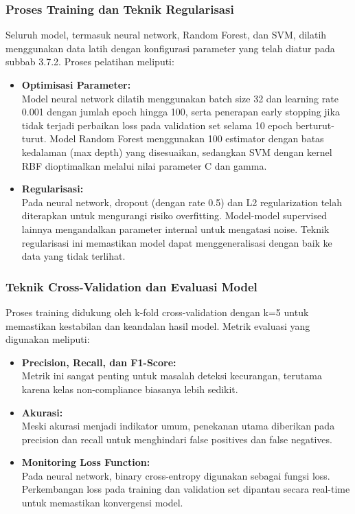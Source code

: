 \subsubsection{Proses Training dan Teknik Regularisasi}
Seluruh model, termasuk neural network, Random Forest, dan SVM, dilatih menggunakan data latih dengan konfigurasi parameter yang telah diatur pada subbab 3.7.2. Proses pelatihan meliputi:
\begin{itemize}
    \item \textbf{Optimisasi Parameter:}\\
    Model neural network dilatih menggunakan batch size 32 dan learning rate 0.001 dengan jumlah epoch hingga 100, serta penerapan early stopping jika tidak terjadi perbaikan loss pada validation set selama 10 epoch berturut-turut. Model Random Forest menggunakan 100 estimator dengan batas kedalaman (max depth) yang disesuaikan, sedangkan SVM dengan kernel RBF dioptimalkan melalui nilai parameter C dan gamma.
    
    \item \textbf{Regularisasi:}\\
    Pada neural network, dropout (dengan rate 0.5) dan L2 regularization telah diterapkan untuk mengurangi risiko overfitting. Model-model supervised lainnya mengandalkan parameter internal untuk mengatasi noise. Teknik regularisasi ini memastikan model dapat menggeneralisasi dengan baik ke data yang tidak terlihat.
\end{itemize}

\subsubsection{Teknik Cross-Validation dan Evaluasi Model}
Proses training didukung oleh k-fold cross-validation dengan k=5 untuk memastikan kestabilan dan keandalan hasil model. Metrik evaluasi yang digunakan meliputi:
\begin{itemize}
    \item \textbf{Precision, Recall, dan F1-Score:}\\
    Metrik ini sangat penting untuk masalah deteksi kecurangan, terutama karena kelas non-compliance biasanya lebih sedikit.
    
    \item \textbf{Akurasi:}\\
    Meski akurasi menjadi indikator umum, penekanan utama diberikan pada precision dan recall untuk menghindari false positives dan false negatives.
    
    \item \textbf{Monitoring Loss Function:}\\
    Pada neural network, binary cross-entropy digunakan sebagai fungsi loss. Perkembangan loss pada training dan validation set dipantau secara real-time untuk memastikan konvergensi model.
\end{itemize}


